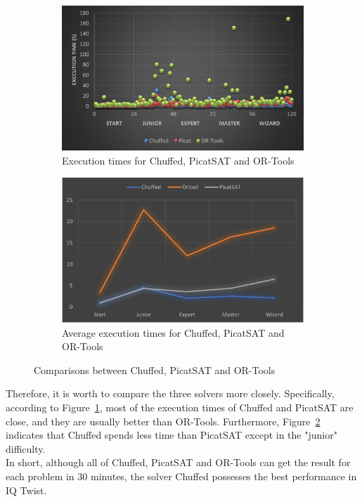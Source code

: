\begin{figure}[H]
\centering
\begin{subfigure}[b]{.48\textwidth}
\centering
\includegraphics[width=\textwidth]{figs/threesolverpoints.png}
\caption{Execution times for Chuffed, PicatSAT and OR-Tools}
\label{fig:3solvers1}
\end{subfigure}
\begin{subfigure}[b]{.48\textwidth}
\centering
\includegraphics[width=\textwidth]{figs/Three comparison.png}
\caption{Average execution times for Chuffed, PicatSAT and OR-Tools}
\label{fig:3comparison}
\end{subfigure}
\caption{Comparisons between Chuffed, PicatSAT and OR-Tools}
\label{fig:3comparisonsssss}
\end{figure}
Therefore, it is worth to compare the three solvers more closely. Specifically, according to Figure~\ref{fig:3solvers1}, most of the execution times of Chuffed and PicatSAT are close, and they are usually better than OR-Tools.
Furthermore, Figure~\ref{fig:3comparison} indicates that Chuffed spends less time than PicatSAT except in the "junior" difficulty.
\\In short, although all of Chuffed, PicatSAT and OR-Tools can get the result for each problem in 30 minutes, the solver Chuffed possesses the best performance in IQ Twist.
